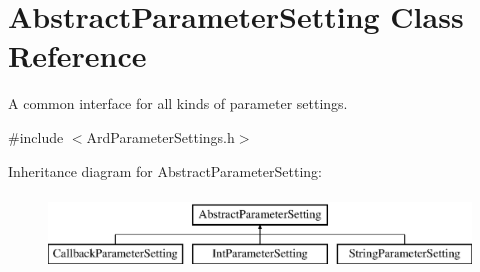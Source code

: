\hypertarget{class_abstract_parameter_setting}{\section{Abstract\-Parameter\-Setting Class Reference}
\label{class_abstract_parameter_setting}
}


A common interface for all kinds of parameter settings.  




{\ttfamily \#include $<$Ard\-Parameter\-Settings.\-h$>$}

Inheritance diagram for Abstract\-Parameter\-Setting\-:\begin{figure}[H]
\begin{center}
\leavevmode
\includegraphics[height=2.000000cm]{class_abstract_parameter_setting}
\end{center}
\end{figure}
